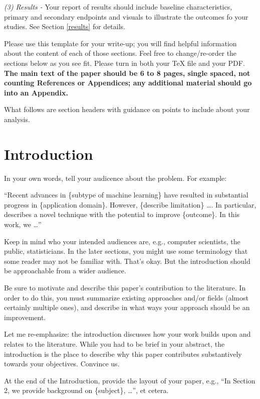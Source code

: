 \documentclass[twoside,11pt]{article}
\begin{document}
\emph{(3) Results -} Your report of results should include baseline characteristics, primary and secondary endpoints and visuals to illustrate the outcomes fo your studies. See Section \ref{results} for details.

\vspace{0.5em}
Please use this template for your write-up; you will find helpful information about the content of each of those sections. Feel free to change/re-order the sections below as you see fit. Please turn in both your TeX file and your PDF. \textbf{The main text of the paper should be 6 to 8 pages, single spaced, not counting References or Appendices; any additional material should go into an Appendix.}

\vspace{0.5em}
What follows are section headers with guidance on points to include about your analysis.

\section{Introduction}
In your own words, tell your audicence about the problem. For example:

``Recent advances in \{subtype of machine learning\} \citep{cite1} have resulted in substantial progress in \{application domain\}. However, \{describe limitation\} \dots.
In particular, \citet{cite2} describes a novel technique with the potential to improve \{outcome\}.
In this work, we \dots''

Keep in mind who your intended audiences are, e.g., computer scientists, the public, statisticians.
In the later sections, you might use some terminology that some reader may not be familiar with.
That's okay. But the introduction should be approachable from a wider audience.

Be sure to motivate and describe this paper's contribution to the literature.
In order to do this, you must summarize existing approaches and/or fields (almost certainly multiple ones),
and describe in what ways your approach should be an improvement. 

Let me re-emphasize: the introduction discusses how your work builds upon and relates to the literature. While you had to be brief in your abstract, the introduction is the place to describe why this paper contributes substantively towards your objectives. Convince us.

At the end of the Introduction, provide the layout of your paper, e.g., ``In Section 2, we provide background on \{subject\}, \dots'',  et cetera.
\end{document}
